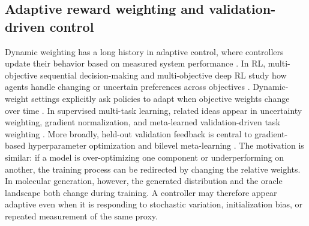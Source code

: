 \documentclass[referee,lineno,pdflatex,sn-basic]{sn-jnl}
\theoremstyle{thmstyleone}%
\theoremstyle{thmstyletwo}%
\theoremstyle{thmstylethree}%
\begin{document}
\subsection{Adaptive reward weighting and validation-driven control}\label{subsec:rw_adaptive}

Dynamic weighting has a long history in adaptive control, where controllers update their behavior based on measured system performance \cite{ref-adaptive-control}. In RL, multi-objective sequential decision-making and multi-objective deep RL study how agents handle changing or uncertain preferences across objectives \cite{ref-roijers-survey,ref-mossalam-modrl}. Dynamic-weight settings explicitly ask policies to adapt when objective weights change over time \cite{ref-abels-dynamic}. In supervised multi-task learning, related ideas appear in uncertainty weighting, gradient normalization, and meta-learned validation-driven task weighting \cite{ref-kendall-uncertainty,ref-gradnorm,ref-autolambda}. More broadly, held-out validation feedback is central to gradient-based hyperparameter optimization and bilevel meta-learning \cite{ref-maclaurin-hyperopt,ref-franceschi-bilevel}. The motivation is similar: if a model is over-optimizing one component or underperforming on another, the training process can be redirected by changing the relative weights. In molecular generation, however, the generated distribution and the oracle landscape both change during training. A controller may therefore appear adaptive even when it is responding to stochastic variation, initialization bias, or repeated measurement of the same proxy.
\end{document}
